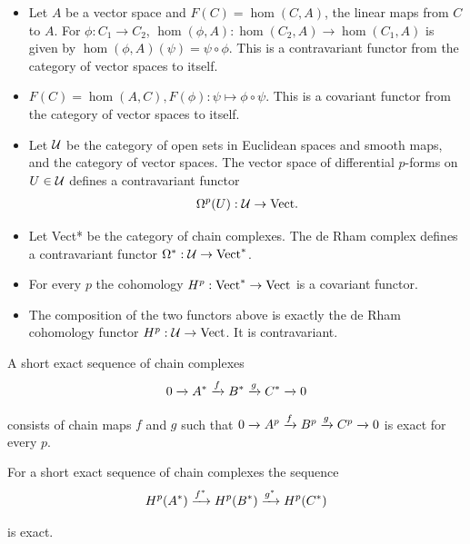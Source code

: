 \begin{itemize}
  \item Let $A$ be a vector space and $F(C) = \hom(C, A)$, the linear maps from
        $C$ to $A$. For $\phi:C_1\to C_2$, $\hom(\phi, A):\hom(C_2, A)\to \hom(C_1,A)$ is
        given by $\hom(\phi, A)(\psi) = \psi\circ\phi$. This is a contravariant functor from the
        category of vector spaces to itself.
  \item $F(C) = \hom(A, C), F(\phi):\psi \mapsto\phi\circ\psi$. This is a covariant functor from the
        category of vector spaces to itself.
  \item Let $\mathcal{U}$ be the category of open sets in Euclidean spaces and smooth maps,
        and  the category of vector spaces. The vector space of differential
        $p$-forms on $U\in\mathcal{U}$ defines a contravariant functor
        \begin{align*}
          \Omega^p(U):\mathcal{U}\to \mathrm{Vect}.
        \end{align*}
  \item Let Vect* be the category of chain complexes. The de Rham complex
        defines a contravariant functor $\Omega^*:\mathcal{U}\to\mathrm{Vect}^*$.
  \item For every $p$ the cohomology $H^p:\mathrm{Vect}^*\to\mathrm{Vect}$ is a covariant functor.
  \item The composition of the two functors above is exactly the de Rham
        cohomology functor $H^p:\mathcal{U}\to\mathrm{Vect}$. It is contravariant.
\end{itemize}

A short exact sequence of chain complexes
\begin{align*}
  0\xra[] A^*\xra[f] B^*\xra[g] C^*\xra[] 0
\end{align*}

consists of chain maps $f$ and $g$ such that $0\xra[]A^p\xra[f]B^p\xra[g]C^p\xra[]0$ is exact
for every $p$.

\begin{lemma}\label{lemma:4-4}
  For a short exact sequence of chain complexes the sequence
  \begin{align*}
    H^p(A^*)\xra[f^*] H^p(B^*)\xra[g^*] H^p(C^*)
  \end{align*}

  is exact.
\end{lemma}

